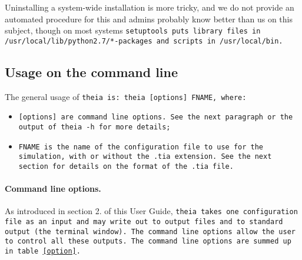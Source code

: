 \documentclass{article}
\begin{document}
Uninstalling a system-wide installation is more tricky, and we do not provide an automated procedure for this and admins probably know better than us on this subject, though on most systems \tt{setuptools} puts library files in \tt{/usr/local/lib/python2.7/*-packages} and scripts in \tt{/usr/local/bin}.

\subsection{Usage on the command line}
The general usage of \tt{theia} is: \tt{theia [options] FNAME}, where:

\begin{itemize}
\item \tt{[options]} are command line options. See the next paragraph or the output of \tt{theia -h} for more details;
\item \tt{FNAME} is the name of the configuration file to use for the simulation, with or without the \tt{.tia} extension. See the next section for details on the format of the \tt{.tia} file.
\end{itemize}

\paragraph{Command line options.}As introduced in section 2. of this User Guide, \tt{theia} takes one configuration file as an input and may write out to output files and to standard output (the terminal window). The command line options allow the user to control all these outputs. The command line options are summed up in table \ref{option}.
\end{document}
